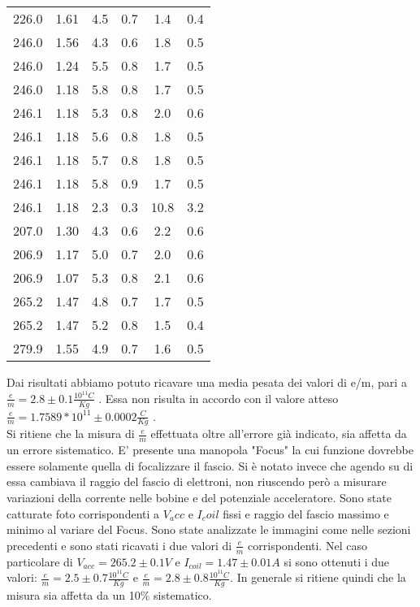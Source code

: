 \begin{table}[h]
\begin{tabular}{*{6}{S[table-figures-exponent = 2]} }
		226.0 & 1.61 & 4.5 & 0.7 & 1.4 & 0.4\\ 
		246.0 & 1.56 & 4.3 & 0.6 & 1.8 & 0.5\\ 
		246.0 & 1.24 & 5.5 & 0.8 & 1.7 & 0.5\\ 
		246.0 & 1.18 & 5.8 & 0.8 & 1.7 & 0.5\\ 
		246.1 & 1.18 & 5.3 & 0.8 & 2.0 & 0.6\\ 
		246.1 & 1.18 & 5.6 & 0.8 & 1.8 & 0.5\\ 
		246.1 & 1.18 & 5.7 & 0.8 & 1.8 & 0.5\\ 
		246.1 & 1.18 & 5.8 & 0.9 & 1.7 & 0.5\\ 
		246.1 & 1.18 & 2.3 & 0.3 & 10.8 & 3.2\\ 
		207.0 & 1.30 & 4.3 & 0.6 & 2.2 & 0.6\\ 
		206.9 & 1.17 & 5.0 & 0.7 & 2.0 & 0.6\\ 
		206.9 & 1.07 & 5.3 & 0.8 & 2.1 & 0.6\\ 
		265.2 & 1.47 & 4.8 & 0.7 & 1.7 & 0.5\\ 
		265.2 & 1.47 & 5.2 & 0.8 & 1.5 & 0.4\\ 
		279.9 & 1.55 & 4.9 & 0.7 & 1.6 & 0.5\\ 
  
 	\end{tabular}
	\caption{ }
	\label{t:tabella2}
\end{table}
Dai risultati abbiamo potuto ricavare una media pesata dei valori di e/m, pari a $\frac{e}{m} = 2.8 \pm 0.1 \frac{10^{11} C}{Kg}$ . Essa non risulta in accordo con il valore atteso $\frac{e}{m} = 1.7589*10^{11} \pm 0.0002 \frac{C}{Kg}$ .\\
Si ritiene che la misura di $\frac{e}{m}$ effettuata oltre all'errore già indicato, sia affetta da un errore sistematico. E' presente una manopola "Focus" la cui funzione dovrebbe essere solamente quella di focalizzare il fascio. Si è notato invece che agendo su di essa cambiava il raggio del fascio di elettroni, non riuscendo però a misurare variazioni della corrente nelle bobine e del potenziale acceleratore. Sono state catturate foto corrispondenti a $V_acc$ e $I_coil$ fissi e raggio del fascio massimo e minimo al variare del Focus. Sono state analizzate le immagini come nelle sezioni precedenti e sono stati ricavati i due valori di $\frac{e}{m}$ corrispondenti. Nel caso particolare di $V_{acc} =265.2 \pm 0.1 V$ e $I_{coil}=1.47 \pm 0.01 A$  si sono ottenuti i due valori: $\frac{e}{m}=2.5 \pm 0.7 \frac{10^{11} C}{Kg}$ e $\frac{e}{m}=2.8 \pm 0.8 \frac{10^{11} C}{Kg}$. In generale si ritiene quindi che la misura sia affetta da un 10\% sistematico.\\
